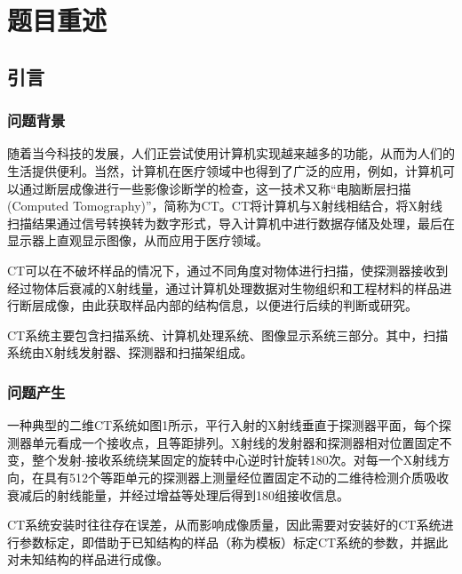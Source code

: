 \documentclass[UTF8]{ctexart}
\begin{document}
\clearpage

\section{题目重述}
\subsection{引言}
\subsubsection{问题背景}

随着当今科技的发展，人们正尝试使用计算机实现越来越多的功能，从而为人们的生活提供便利。当然，计算机在医疗领域中也得到了广泛的应用，例如，计算机可以通过断层成像进行一些影像诊断学的检查，这一技术又称“电脑断层扫描(Computed Tomography)”，简称为CT。CT将计算机与X射线相结合，将X射线扫描结果通过信号转换转为数字形式，导入计算机中进行数据存储及处理，最后在显示器上直观显示图像，从而应用于医疗领域。

CT可以在不破坏样品的情况下，通过不同角度对物体进行扫描，使探测器接收到经过物体后衰减的X射线量，通过计算机处理数据对生物组织和工程材料的样品进行断层成像，由此获取样品内部的结构信息，以便进行后续的判断或研究。

CT系统主要包含扫描系统、计算机处理系统、图像显示系统三部分。其中，扫描系统由X射线发射器、探测器和扫描架组成。

\subsubsection{问题产生}
一种典型的二维CT系统如图1所示，平行入射的X射线垂直于探测器平面，每个探测器单元看成一个接收点，且等距排列。X射线的发射器和探测器相对位置固定不变，整个发射-接收系统绕某固定的旋转中心逆时针旋转180次。对每一个X射线方向，在具有512个等距单元的探测器上测量经位置固定不动的二维待检测介质吸收衰减后的射线能量，并经过增益等处理后得到180组接收信息。

CT系统安装时往往存在误差，从而影响成像质量，因此需要对安装好的CT系统进行参数标定，即借助于已知结构的样品（称为模板）标定CT系统的参数，并据此对未知结构的样品进行成像。
\end{document}
